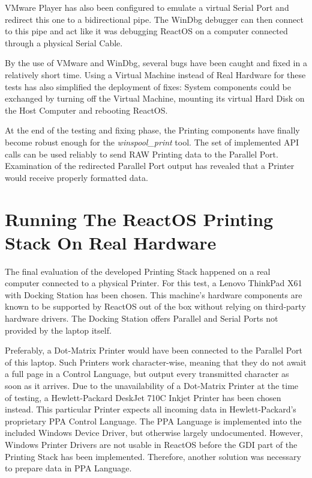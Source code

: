 VMware Player has also been configured to emulate a virtual Serial Port and redirect this one to a bidirectional pipe.
The WinDbg debugger can then connect to this pipe and act like it was debugging ReactOS on a computer connected through a physical Serial Cable.

By the use of VMware and WinDbg, several bugs have been caught and fixed in a relatively short time.
Using a Virtual Machine instead of Real Hardware for these tests has also simplified the deployment of fixes:
System components could be exchanged by turning off the Virtual Machine, mounting its virtual Hard Disk on the Host Computer and rebooting ReactOS.

At the end of the testing and fixing phase, the Printing components have finally become robust enough for the \emph{winspool\_print} tool.
The set of implemented \gls{API} calls can be used reliably to send RAW Printing data to the Parallel Port.
Examination of the redirected Parallel Port output has revealed that a Printer would receive properly formatted data.


\section{Running The ReactOS Printing Stack On Real Hardware}
The final evaluation of the developed Printing Stack happened on a real computer connected to a physical Printer.
For this test, a Lenovo ThinkPad X61 with Docking Station has been chosen.
This machine's hardware components are known to be supported by ReactOS out of the box without relying on third-party hardware drivers.
The Docking Station offers Parallel and Serial Ports not provided by the laptop itself.

Preferably, a Dot-Matrix Printer would have been connected to the Parallel Port of this laptop.
Such Printers work character-wise, meaning that they do not await a full page in a Control Language, but output every transmitted character as soon as it arrives.
Due to the unavailability of a Dot-Matrix Printer at the time of testing, a Hewlett-Packard DeskJet 710C Inkjet Printer has been chosen instead.
This particular Printer expects all incoming data in Hewlett-Packard's proprietary \gls{PPA} Control Language.
The \gls{PPA} Language is implemented into the included Windows Device Driver, but otherwise largely undocumented.
However, Windows Printer Drivers are not usable in ReactOS before the \gls{GDI} part of the Printing Stack has been implemented.
Therefore, another solution was necessary to prepare data in \gls{PPA} Language.

